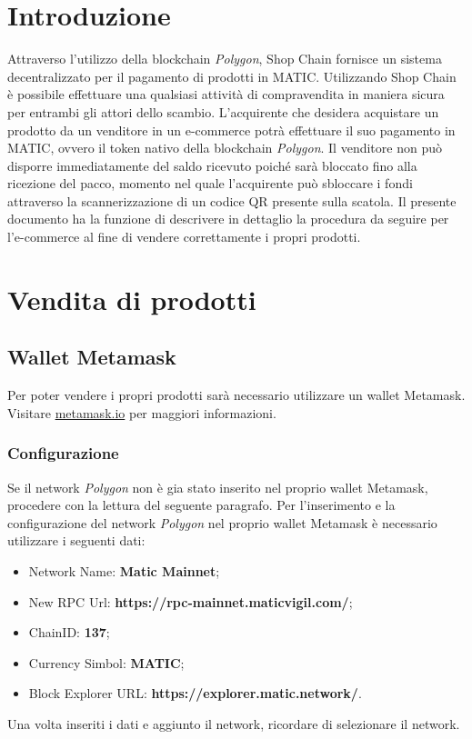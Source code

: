 \documentclass[a4paper, 12pt]{article}
\begin{document}
\makefrontpage
\tableofcontents
\newpage

\section{Introduzione}
Attraverso l'utilizzo della blockchain \textit{Polygon}, Shop Chain fornisce un sistema decentralizzato per il pagamento di prodotti in MATIC. Utilizzando Shop Chain è possibile effettuare una qualsiasi attività di compravendita in maniera sicura per entrambi gli attori dello scambio. L'acquirente che desidera acquistare un prodotto da un venditore in un e-commerce potrà effettuare il suo pagamento in MATIC, ovvero il token nativo della blockchain \textit{Polygon}. Il venditore non può disporre immediatamente del saldo ricevuto poiché sarà bloccato fino alla ricezione del pacco, momento nel quale l'acquirente può sbloccare i fondi attraverso la scannerizzazione di un codice QR presente sulla scatola.
Il presente documento ha la funzione di descrivere in dettaglio la procedura da seguire per l'e-commerce al fine di vendere correttamente i propri prodotti.

\section{Vendita di prodotti}
\subsection{Wallet Metamask}
Per poter vendere i propri prodotti sarà necessario utilizzare un wallet Metamask. Visitare \href{https://www.metamask.io}{metamask.io} per maggiori informazioni.
\subsubsection{Configurazione}
Se il network \textit{Polygon} non è gia stato inserito nel proprio wallet Metamask, procedere con la lettura del seguente paragrafo.
Per l'inserimento e la configurazione del network \textit{Polygon} nel proprio wallet Metamask è necessario utilizzare i seguenti dati:
\begin{itemize}
\item Network Name: \textbf{Matic Mainnet};
\item New RPC Url: \textbf{https://rpc-mainnet.maticvigil.com/};
\item ChainID: \textbf{137};
\item Currency Simbol: \textbf{MATIC};
\item Block Explorer URL: \textbf{https://explorer.matic.network/}.
\end{itemize}
Una volta inseriti i dati e aggiunto il network, ricordare di selezionare il network.
\end{document}
